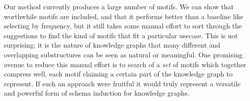 \documentclass[letterpaper]{article} %
\begin{document}
Our method currently produces a large number of motifs. We can show that worthwhile motifs are included, and that it performs better than a baseline like selecting by frequency, but it still takes some manual effort to sort through the suggestions to find the kind of motifs that fit a particular usecase. This is not surprising; it is the nature of knowledge graphs that many different and overlapping substructures can be seen as natural or meaningful. One promising avenue to reduce this manual effort is to search of a \emph{set} of motifs which together compress well, each motif claiming a certain part of the knowledge graph to represent. If such an approach were fruitful it would truly represent a versatile and powerful form of schema induction for knowledge graphs.





\end{document}
